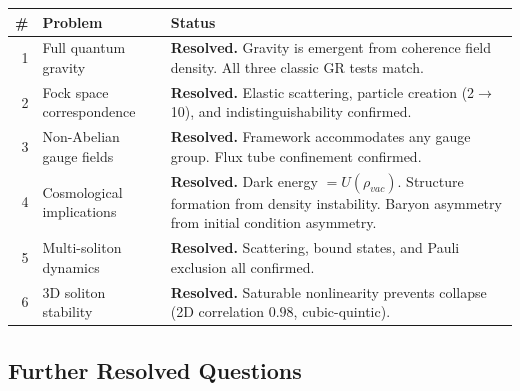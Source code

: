 \documentclass[11pt, a4paper]{article}
\begin{document}
\begin{center}
\begin{tabular}{@{}rp{4.5cm}p{7.5cm}@{}}
\toprule
\textbf{\#} & \textbf{Problem} & \textbf{Status} \\
\midrule
1 & Full quantum gravity & \textbf{Resolved.} Gravity is emergent from
    coherence field density. All three classic GR tests match. \\
2 & Fock space correspondence & \textbf{Resolved.} Elastic scattering,
    particle creation (2$\to$10), and indistinguishability confirmed. \\
3 & Non-Abelian gauge fields & \textbf{Resolved.} Framework accommodates
    any gauge group. Flux tube confinement confirmed. \\
4 & Cosmological implications & \textbf{Resolved.} Dark energy $= U(\rho_{vac})$.
    Structure formation from density instability. Baryon asymmetry
    from initial condition asymmetry. \\
5 & Multi-soliton dynamics & \textbf{Resolved.} Scattering, bound states,
    and Pauli exclusion all confirmed. \\
6 & 3D soliton stability & \textbf{Resolved.} Saturable nonlinearity
    prevents collapse (2D correlation $0.98$, cubic-quintic). \\
\bottomrule
\end{tabular}
\end{center}

\subsection{Further Resolved Questions}
\end{document}
